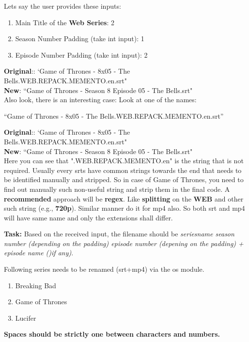 \documentclass[12pt,  letterpaper,  twoside]{article}
\begin{document}
	Lets say the user provides these inputs: 

	
	\begin{enumerate}
		\item Main Title of the \textbf{Web Series}: 2 
		\item Season Number Padding (take int input): 1
		\item Episode Number Padding (take int input): 2
	\end{enumerate} 
	
	
	
	\noindent
	\textbf{Original}:: `Game of Thrones - 8x05 - The 
	Bells.WEB.REPACK.MEMENTO.en.srt"  \\
	\textbf{New}: ``Game of Thrones - Season 8 Episode 05 - 
	The 
	Bells.srt" \\
	
	Also look,  there is an interesting case:
	Look at one of the names:
	
	``Game of Thrones - 8x05 - The 
	Bells.WEB.REPACK.MEMENTO.en.srt''
	 
	
	
	\noindent
\textbf{Original}:: `Game of Thrones - 8x05 - The 
Bells.WEB.REPACK.MEMENTO.en.srt"  \\
\textbf{New}: ``Game of Thrones - Season 8 Episode 05 - 
The 
Bells.srt" \\
	
	 
	
	Here you can see that ".WEB.REPACK.MEMENTO.en" is the string that is not 
	required. 
	Usually every srts have common strings towards the end that needs to be 
	identified manually and stripped. So in case of Game of Thrones,  you need 
	to find 
	out manually such non-useful string and strip them in the final code. A 
	\textbf{recommended} approach will be \textbf{regex}. Like 
	\textbf{splitting} on the \textbf{WEB} and other such string (e.g., 
	\textbf{720p}). Similar manner do it for mp4 also. So both srt and mp4 will 
	have same name and only the extensions shall differ.
	
	\textbf{Task:} Based on the received input,  the filename should be 
	\textit{seriesname season number (depending on the padding) episode number 
	(depening on the padding) + episode name ()if any)}.  
	
	
	Following series needs to be renamed (srt+mp4) via the os module. 
	
	\begin{enumerate}
		\item Breaking Bad
		\item Game of Thrones
				\item Lucifer
	\end{enumerate}
	
	\textbf{
		Spaces should be strictly one between characters and numbers.}
	
	
\end{document}

